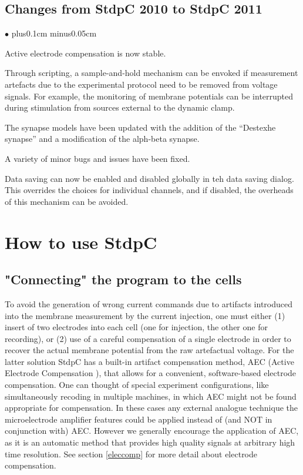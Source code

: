 \documentclass{article}
\newenvironment{myitem}{\begin{list}{$\bullet$}{\setlength{\leftmargin}{1.1em}
\itemsep0.1cm plus0.1cm minus0.05cm
\listparindent0cm
\addtolength{\labelsep}{0.5\labelsep}
\setlength{\labelwidth}{0.8em}
\setlength{\leftmargin}{\labelwidth}
\addtolength{\leftmargin}{\labelsep}
}}{\end{list}}
\begin{document}
\subsection{Changes from StdpC 2010 to StdpC 2011}
\begin{myitem}
\item Active electrode compensation is now stable.
\item Through scripting, a sample-and-hold mechanism can be envoked if
  measurement artefacts due to the experimental protocol need to be
  removed from voltage signals. For example, the monitoring of
  membrane potentials can be interrupted during stimulation from
  sources external to the dynamic clamp.
\item The synapse models have been updated with the addition of the
  ``Destexhe synapse'' and a modification of the alph-beta synapse.
\item A variety of minor bugs and issues have been fixed.
\item Data saving can now be enabled and disabled globally in teh data
  saving dialog. This overrides the choices for individual channels,
  and if disabled, the overheads of this mechanism can be avoided.
\end{myitem}

\section{How to use StdpC}

\subsection{"Connecting" the program to the cells}
 
To avoid the generation of wrong current commands due to artifacts
introduced into the membrane measurement by the current injection,
one must either (1) insert of two electrodes into each cell (one for
injection, the other one for recording), or
(2) use of a careful compensation of a single electrode in order to recover the
actual membrane potential from the raw artefactual voltage. For the
latter solution StdpC has a built-in artifact compensation method, AEC
(Active Electrode Compensation \cite{Brette2008}), that allows for a
convenient, software-based electrode compensation. One can thought of
special experiment configurations, like simultaneously recoding in multiple
machines, in which AEC might not be found appropriate for compensation. In
these cases any external analogue technique the microelectrode amplifier features could
be applied instead of (and NOT in conjunction with) AEC. However we
generally encourage the application of AEC, as it is an automatic method
that provides high quality signals at arbitrary high time resolution.
See section \ref{eleccomp} for more detail about electrode compensation.
\end{document}
